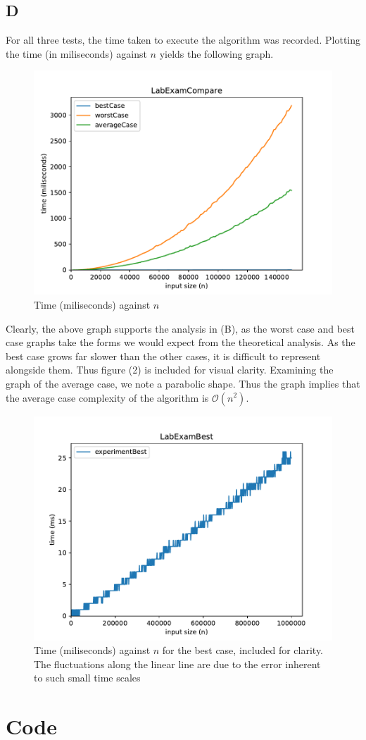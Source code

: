 \documentclass[a4paper]{article}
\begin{document}
\subsection{D}
For all three tests, the time taken to execute the algorithm was recorded. Plotting the time (in miliseconds) against $n$ yields the following graph.
\begin{figure}[H]
	\centering
	\includegraphics[scale=0.6]{LabExamCompare.pdf}
	\caption{Time (miliseconds) against $n$}
\end{figure}
Clearly, the above graph supports the analysis in (B), as the worst case and best case graphs take the forms we would expect from the theoretical analysis. As the best case grows far slower than the other cases, it is difficult to represent alongside them. Thus figure (2) is included for visual clarity.
\newline
Examining the graph of the average case, we note a parabolic shape. Thus the graph implies that the average case complexity of the algorithm is $\mathcal{O}(n^2)$.
\begin{figure}[H]
	\centering
	\includegraphics[scale=0.6]{LabExamBest.pdf}
	\caption{Time (miliseconds) against $n$ for the best case, included for clarity. The fluctuations along the linear line are due to the error inherent to such small time scales}
\end{figure}
\newpage
\section{Code}

\end{document}
